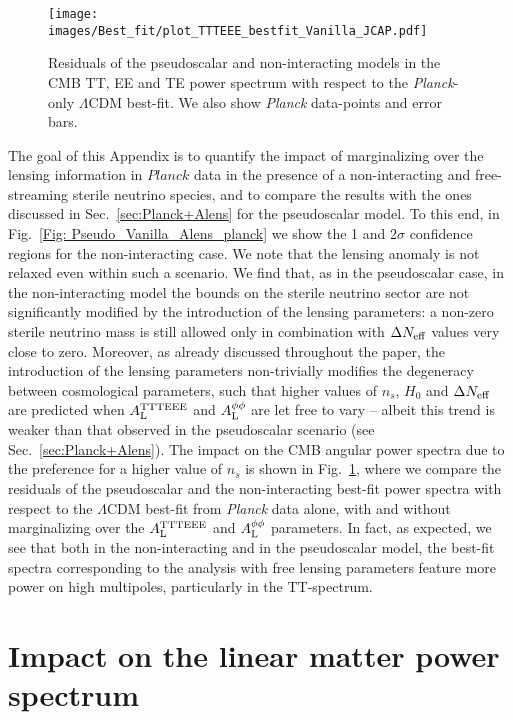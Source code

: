 \documentclass[a4paper,11pt]{article}
\begin{document}
 \begin{figure}[t]
 \centering
   \texttt{[image: images/Best\_fit/plot\_TTTEEE\_bestfit\_Vanilla\_JCAP.pdf]}  
  \caption{Residuals of the pseudoscalar and non-interacting models in the CMB TT, EE and TE power spectrum with respect to the \emph{Planck}-only $\Lambda$CDM best-fit.
  We also show \emph{Planck} data-points and error bars. }
  \label{fig: ResidualVanilla}
\end{figure}




The goal of this Appendix is to quantify the impact of marginalizing over the lensing information in $Planck$ data in the presence of a non-interacting and free-streaming sterile neutrino species, and to compare the results with the ones discussed in Sec.~\ref{sec:Planck+Alens} for the pseudoscalar model. To this end, in Fig.~\ref{Fig: Pseudo_Vanilla_Alens_planck} we show the 1 and 2$\sigma$ confidence regions for the non-interacting case.
We note that the lensing anomaly is not relaxed even within such a scenario. We find that, as in the pseudoscalar case, in the non-interacting model the bounds on the sterile neutrino sector are not significantly modified by the introduction of the lensing parameters: 
a non-zero sterile neutrino mass is still allowed only in combination with $\Delta N_{\rm eff}$ values very close to zero.
Moreover, as already discussed throughout the paper, the introduction of the lensing parameters non-trivially modifies the degeneracy between cosmological parameters, such that higher values of $n_s$, $H_0$ and $\Delta N_{\rm{eff}}$ are predicted when $A^{\rm TTTEEE}_{\rm{L}}$ and $A^{\phi\phi}_{\rm{L}}$ are let free to vary -- albeit this trend is weaker than that observed in the pseudoscalar scenario (see Sec.~\ref{sec:Planck+Alens}). The impact on the CMB angular power spectra due to the preference for a higher value of $n_s$ is shown in Fig.~\ref{fig: ResidualVanilla}, where we compare the residuals of the pseudoscalar and the non-interacting best-fit power spectra with respect to the $\Lambda$CDM best-fit from \emph{Planck} data alone, with and without marginalizing over the $A^{\rm TTTEEE}_{\rm{L}}$ and $A^{\phi\phi}_{\rm{L}}$ parameters. In fact, as expected, we see that both in the non-interacting and in the pseudoscalar model, the best-fit spectra corresponding to the analysis with free lensing parameters feature more power on high multipoles, particularly in the TT-spectrum. 



\section{Impact on the linear matter power spectrum}
\end{document}
